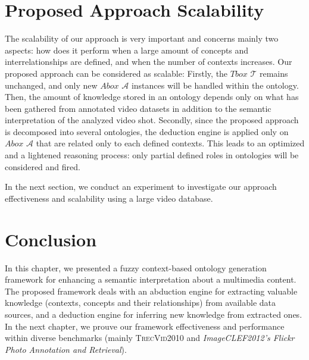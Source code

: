 		\section{Proposed Approach Scalability}
		The scalability of our approach is very important
		and concerns mainly two aspects: how does it perform when a large amount of concepts 
		and interrelationships are defined, and when the number of contexts
		increases. Our proposed approach can be considered as scalable:
		Firstly, the $Tbox$ $\mathcal{T}$ remains unchanged, and only new $Abox$ $\mathcal{A}$ 
		instances will be handled within the ontology. Then, the amount of knowledge 
		stored in an ontology depends only on what has been gathered from annotated 
		video datasets in addition to the semantic interpretation of the analyzed video shot. 
		Secondly, since the proposed approach is decomposed into several ontologies, 
		the deduction engine is applied only on
		$Abox$ $\mathcal{A}$ that are related only to each defined contexts. 
		This leads to an optimized and a lightened reasoning process: only partial 
		defined roles in ontologies will be considered and fired.
		
		In the next section, we conduct an experiment to investigate our
		approach effectiveness and scalability using a large video database.


\section{Conclusion}

In this chapter, we presented a fuzzy context-based ontology generation framework for enhancing a semantic interpretation about a multimedia content. The proposed framework deals with an abduction engine for extracting valuable knowledge (contexts, concepts and their relationships) from available data sources, and a deduction engine for inferring new knowledge from extracted ones. In the next chapter, we prouve our framework effectiveness and performance within diverse benchmarks (mainly \textsc{TrecVid2010} and \emph{ImageCLEF2012's Flickr Photo Annotation and Retrieval}).
